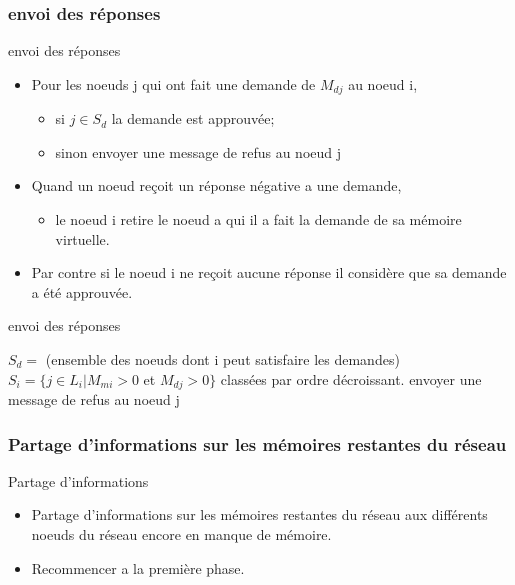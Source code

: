 \documentclass[10pt, c]{beamer}
\begin{document}
    \subsubsection{envoi des réponses}
    	    \begin{frame}{envoi des réponses}
    	        \begin{itemize}
    	             \item Pour les noeuds j qui ont fait une demande de $M_{dj}$ au noeud i,
        	            \begin{itemize}
        	                \item si $j \in S_d$ la demande est approuvée;
        	               \item sinon  envoyer une message de refus au noeud j
        	            \end{itemize}
        	              \item Quand un noeud reçoit un réponse négative a une demande,
                    \begin{itemize}
                        \item le noeud i retire le noeud a qui il a fait la demande de sa mémoire virtuelle.
                    \end{itemize}
                      \item Par contre si le noeud i ne reçoit aucune réponse il considère que sa demande a été approuvée. 
    	        \end{itemize}
    	    \end{frame}
    	    \begin{frame}{envoi des réponses}
                \begin{algorithm}[H]
                    \caption{envoi des réponses}
                    \begin{algorithmic}
                        \STATE   $S_d =$ (ensemble des noeuds dont i peut satisfaire les demandes)
                        \STATE $S_{i} = \{ j \in L_i | M_{mi} >0$ et $M_{dj} > 0 \} $ classées par ordre décroissant.
                               \STATE envoyer une message de refus au noeud j
                            \ENDIF
                        \ENDFOR
                    \end{algorithmic}
                \end{algorithm}
            \end{frame}
    \subsubsection{Partage d'informations sur les mémoires restantes du réseau}
    	     \begin{frame}{Partage d'informations}
    	     \begin{itemize}
    	         \item Partage d'informations sur les mémoires restantes du réseau aux différents noeuds du réseau encore en manque de mémoire.
    	         \item Recommencer a la première phase.
    	     \end{itemize}
    	 \end{frame}
\end{document}
